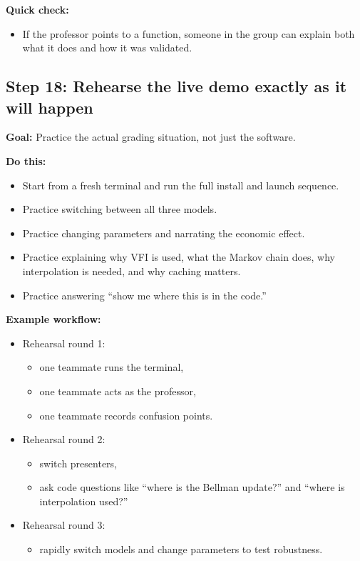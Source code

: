 \documentclass[11pt]{article}
\begin{document}
\textbf{Quick check:}
\begin{itemize}
    \item If the professor points to a function, someone in the group can explain both what it does and how it was validated.
\end{itemize}

\subsection{Step 18: Rehearse the live demo exactly as it will happen}
\textbf{Goal:} Practice the actual grading situation, not just the software.

\textbf{Do this:}
\begin{itemize}
    \item Start from a fresh terminal and run the full install and launch sequence.
    \item Practice switching between all three models.
    \item Practice changing parameters and narrating the economic effect.
    \item Practice explaining why VFI is used, what the Markov chain does, why interpolation is needed, and why caching matters.
    \item Practice answering ``show me where this is in the code.''
\end{itemize}

\textbf{Example workflow:}
\begin{itemize}
    \item Rehearsal round 1:
    \begin{itemize}
        \item one teammate runs the terminal,
        \item one teammate acts as the professor,
        \item one teammate records confusion points.
    \end{itemize}
    \item Rehearsal round 2:
    \begin{itemize}
        \item switch presenters,
        \item ask code questions like ``where is the Bellman update?'' and ``where is interpolation used?''
    \end{itemize}
    \item Rehearsal round 3:
    \begin{itemize}
        \item rapidly switch models and change parameters to test robustness.
    \end{itemize}
\end{itemize}
\end{document}
